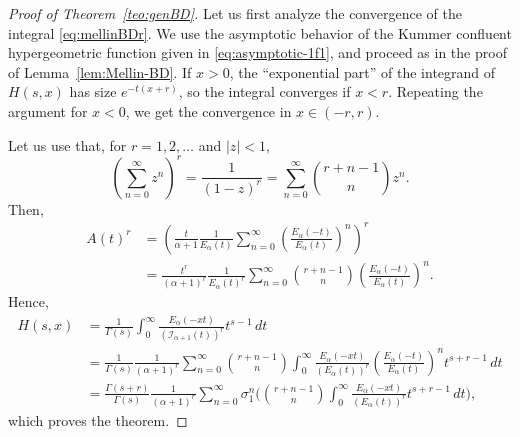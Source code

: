 \documentclass[a4paper]{amsart}
\newcommand{\I}{\mathcal{I}}
\newcommand{\Ea}{E_{\alpha}}
\theoremstyle{plain}
\theoremstyle{definition}
\theoremstyle{remark}
\numberwithin{equation}{section}
\begin{document}
\begin{proof}[Proof of Theorem~\ref{teo:genBD}]
Let us first analyze the convergence of the integral \eqref{eq:mellinBDr}.
We use the asymptotic behavior of the Kummer confluent hypergeometric function given in \eqref{eq:asymptotic-1f1}, and proceed as in the proof of Lemma~\ref{lem:Mellin-BD}. If $x > 0$, the ``exponential part'' of the integrand of $H(s,x)$ has size $e^{-t(x+r)}$, so the integral converges if $x<r$. Repeating the argument for $x<0$, we get the convergence in $x\in(-r,r)$.

Let us use that, for $r=1,2,\dots$ and $|z|<1$, 
\[
  \left(\sum_{n=0}^{\infty} z^n\right)^r 
  = \frac{1}{(1-z)^r} = \sum_{n=0}^{\infty} \binom{r+n-1}{n} z^n.
\]
Then,
\begin{align*}
A(t)^r &= \left( \frac{t}{\alpha+1}\frac{1}{\Ea(t)}
\sum_{n=0}^{\infty} \left(\frac{\Ea(-t)}{\Ea(t)}\right)^n\right)^r \\
&= \frac{t^r}{(\alpha+1)^r}\frac{1}{\Ea(t)^r} 
\sum_{n=0}^{\infty} \binom{r+n-1}{n} \left(\frac{\Ea(-t)}{\Ea(t)}\right)^n.
\end{align*}
Hence,
\begin{align*}
H(s,x) & = \frac{1}{\Gamma(s)} \int_{0}^{\infty} 
\frac{\Ea(-xt)}{\left(\I_{\alpha+1}(t)\right)^r} t^{s-1} \,dt \\
& = \frac{1}{\Gamma(s)} \frac{1}{(\alpha+1)^r} 
\sum_{n=0}^{\infty} \binom{r+n-1}{n} \int_{0}^{\infty}
\frac{ \Ea(-xt)}{\left(\Ea(t)\right)^r} 
\left(\frac{\Ea(-t)}{\Ea(t)}\right)^n t^{s+r-1} \,dt \\
&  = \frac{\Gamma(s+r)}{\Gamma(s)} \frac{1}{(\alpha+1)^r}
\sum_{n=0}^{\infty} \sigma_1^n 
\Biggl( \binom{r+n-1}{n} \int_{0}^{\infty} 
\frac{\Ea(-xt)}{\left(\Ea(t)\right)^r} t^{s+r-1} \,dt \Biggr),
\end{align*}
which proves the theorem.
\end{proof}
\end{document}
